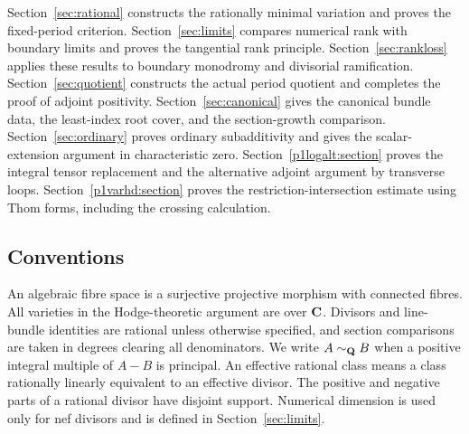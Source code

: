 Section~\ref{sec:rational} constructs the rationally minimal variation and proves the
fixed-period criterion. Section~\ref{sec:limits} compares numerical rank with
boundary limits and proves the tangential rank principle.
Section~\ref{sec:rankloss} applies these results to boundary monodromy and divisorial
ramification. Section~\ref{sec:quotient} constructs the actual period quotient and
completes the proof of adjoint positivity. Section~\ref{sec:canonical} gives the
canonical bundle data, the least-index root cover, and the
section-growth comparison. Section~\ref{sec:ordinary} proves ordinary subadditivity
and gives the scalar-extension argument in characteristic zero.
Section~\ref{p1logalt:section} proves the integral tensor replacement and the alternative
adjoint argument by transverse loops. Section~\ref{p1varhd:section} proves the
restriction-intersection estimate using Thom forms, including the
crossing calculation.

\subsection{Conventions}
An algebraic fibre space is a surjective projective morphism with
connected fibres. All varieties in the Hodge-theoretic argument are
over $\mathbf C$. Divisors and line-bundle identities are rational unless
otherwise specified, and section comparisons are taken in degrees
clearing all denominators. We write $A\sim_{\mathbf Q}B$ when a positive
integral multiple of $A-B$ is principal. An effective rational class
means a class rationally linearly equivalent to an effective divisor.
The positive and negative parts of a rational divisor have disjoint
support. Numerical dimension is used only for nef divisors and is
defined in Section~\ref{sec:limits}.
